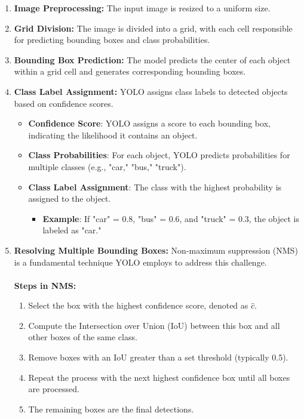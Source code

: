 \begin{enumerate}
  \item \textbf{Image Preprocessing:} The input image is resized to a uniform size.
  \item \textbf{Grid Division:} The image is divided into a grid, with each cell responsible for predicting bounding boxes and class probabilities.
  \item \textbf{Bounding Box Prediction:} The model predicts the center of each object within a grid cell and generates corresponding bounding boxes.
  \item \textbf{Class Label Assignment:} YOLO assigns class labels to detected objects based on confidence scores.
  \begin{itemize}
    \item \textbf{Confidence Score}: YOLO assigns a score to each bounding box, indicating the likelihood it contains an object.
    \item \textbf{Class Probabilities}: For each object, YOLO predicts probabilities for multiple classes (e.g., "car," "bus," "truck").
    \item \textbf{Class Label Assignment}: The class with the highest probability is assigned to the object.
    \begin{itemize}
       \item \textbf{Example}: If "car" = 0.8, "bus" = 0.6, and "truck" = 0.3, the object is labeled as "car."
    \end{itemize}
  \end{itemize}
  \item \textbf{Resolving Multiple Bounding Boxes:} Non-maximum suppression (NMS) is a fundamental technique YOLO employs to address this challenge.\\\\
  \textbf{Steps in NMS:}
  \begin{enumerate}
    \item Select the box with the highest confidence score, denoted as $\hat{c}$.
    \item Compute the Intersection over Union (IoU) between this box and all other boxes of the same class.
    \item Remove boxes with an IoU greater than a set threshold (typically 0.5).
    \item Repeat the process with the next highest confidence box until all boxes are processed.
    \item The remaining boxes are the final detections.
\end{enumerate}
\end{enumerate}
